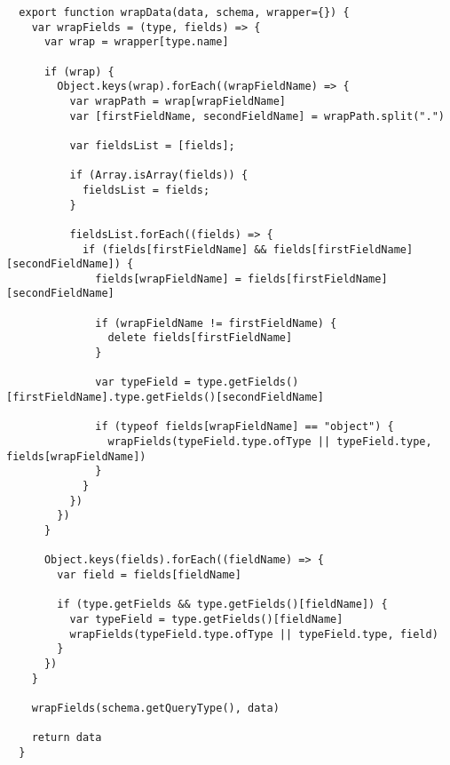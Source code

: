 \begin{verbatim}
  export function wrapData(data, schema, wrapper={}) {
    var wrapFields = (type, fields) => {
      var wrap = wrapper[type.name]

      if (wrap) {
        Object.keys(wrap).forEach((wrapFieldName) => {
          var wrapPath = wrap[wrapFieldName]
          var [firstFieldName, secondFieldName] = wrapPath.split(".")

          var fieldsList = [fields];

          if (Array.isArray(fields)) {
            fieldsList = fields;
          }

          fieldsList.forEach((fields) => {
            if (fields[firstFieldName] && fields[firstFieldName][secondFieldName]) {
              fields[wrapFieldName] = fields[firstFieldName][secondFieldName]

              if (wrapFieldName != firstFieldName) {
                delete fields[firstFieldName]
              }

              var typeField = type.getFields()[firstFieldName].type.getFields()[secondFieldName]

              if (typeof fields[wrapFieldName] == "object") {
                wrapFields(typeField.type.ofType || typeField.type, fields[wrapFieldName])
              }
            }
          })
        })
      }

      Object.keys(fields).forEach((fieldName) => {
        var field = fields[fieldName]

        if (type.getFields && type.getFields()[fieldName]) {
          var typeField = type.getFields()[fieldName]
          wrapFields(typeField.type.ofType || typeField.type, field)
        }
      })
    }

    wrapFields(schema.getQueryType(), data)

    return data
  }
\end{verbatim}
